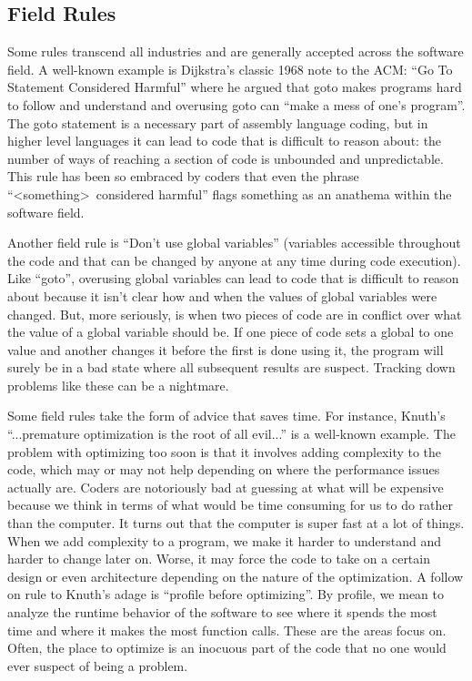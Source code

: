 \subsection{Field Rules}

Some rules transcend all industries and are generally accepted across the
software field. A well-known example is Dijkstra's classic 1968 note to the
ACM: ``Go To Statement Considered Harmful'' where he argued that goto makes
programs hard to follow and understand and overusing goto can ``make a mess of
one's program''. The goto statement is a necessary part of assembly language
coding, but in higher level languages it can lead to code that is difficult to
reason about: the number of ways of reaching a section of code is unbounded and
unpredictable. This rule has been so embraced by coders that even the phrase
``\textless something\textgreater\ considered harmful'' flags something as an
anathema within the software field.

Another field rule is ``Don't use global variables'' (variables accessible
throughout the code and that can be changed by anyone at any time during code
execution). Like ``goto'', overusing global variables can lead to code that is
difficult to reason about because it isn't clear how and when the values of
global variables were changed. But, more seriously, is when two pieces of code
are in conflict over what the value of a global variable should be. If one
piece of code sets a global to one value and another changes it before the
first is done using it, the program will surely be in a bad state where all
subsequent results are suspect. Tracking down problems like these can be a
nightmare.

Some field rules take the form of advice that saves time. For instance, Knuth's
``...premature optimization is the root of all evil...'' is a well-known
example. The problem with optimizing too soon is that it involves adding
complexity to the code, which may or may not help depending on where the
performance issues actually are. Coders are notoriously bad at guessing at what
will be expensive because we think in terms of what would be time consuming for
us to do rather than the computer. It turns out that the computer is super fast
at a lot of things. When we add complexity to a program, we make it harder to
understand and harder to change later on. Worse, it may force the code to take
on a certain design or even architecture depending on the nature of the
optimization.  A follow on rule to Knuth's adage is ``profile before
optimizing''. By profile, we mean to analyze the runtime behavior of the
software to see where it spends the most time and where it makes the most
function calls. These are the areas focus on. Often, the place to optimize is
an inocuous part of the code that no one would ever suspect of being a problem.


